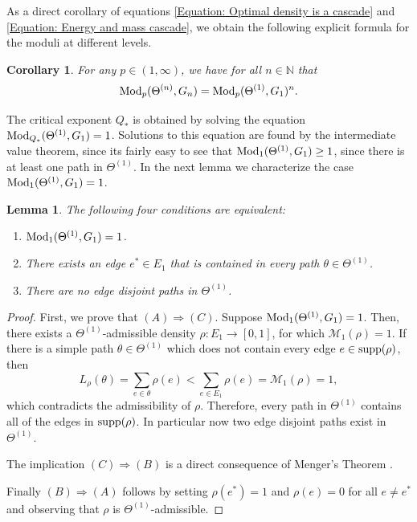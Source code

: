 \documentclass{amsart}
\newcommand{\Mod}{{\rm Mod}}
\newcommand{\supp}{{\rm supp}}
\newtheorem{lemma}[equation]{Lemma}
\newtheorem{corollary}[equation]{Corollary}
\numberwithin{equation}{section}
\theoremstyle{definition}
\theoremstyle{remark}
\newcommand{\N}{\mathbb{N}}
\newcommand{\cM}{\mathcal{M}}
\begin{document}
As a direct corollary of equations \eqref{Equation: Optimal density is a cascade} and \eqref{Equation: Energy and mass cascade}, we obtain the following explicit formula for the moduli at different levels. 

\begin{corollary}\label{Corollary: Modulus in multiplicative}
    For any \(p\in(1,\infty)\), we have for all \(n\in \N\) that 
        \[
            \Mod_p(\Theta^{(n)},G_n)=\Mod_p(\Theta^{(1)},G_1)^n.
        \]
\end{corollary}

The critical exponent $Q_*$ is obtained by solving the equation $\Mod_{Q_*}(\Theta^{(1)}, G_1)=1$. Solutions to this equation are found by the intermediate value theorem, since its fairly easy to see that $\Mod_{1}(\Theta^{(1)}, G_1)\geq 1$, since there is at least one path in $\Theta^{(1)}$. In the next lemma we characterize the case $\Mod_{1}(\Theta^{(1)}, G_1)=1$.  

\begin{lemma}\label{Lemma: Cut-points}
    The following four conditions are equivalent:
    \begin{enumerate}
        \item[(A)] \(\Mod_1(\Theta^{(1)},G_1)=1\).
        \item[(B)] There exists an edge \(e^*\in E_1\) that is contained in every path \(\theta\in\Theta^{(1)}\).
        \item[(C)] There are no edge disjoint paths in \(\Theta^{(1)}\).

    \end{enumerate}
\end{lemma}
\begin{proof}
    First, we prove that \((A)\Longrightarrow(C)\).
    Suppose \(\Mod_1(\Theta^{(1)},G_1)=1\). 
    Then, there exists a \(\Theta^{(1)}\)-admissible density \(\rho\colon E_1\to[0,1]\), for which \(\cM_1(\rho)=1\). If there is a simple path \(\theta\in\Theta^{(1)}\) which does not contain every edge \(e\in \supp(\rho)\), then
        \[
            L_\rho(\theta)=\sum_{e\in \theta}\rho(e)<\sum_{e\in E_1}\rho(e)=\cM_1(\rho)=1,
        \]
    which contradicts the admissibility of \(\rho\). Therefore, every path in \(\Theta^{(1)}\) contains all of the edges in \(\supp(\rho)\). In particular now two edge disjoint paths exist in $\Theta^{(1)}$. 
    
    The implication \((C)\Longrightarrow(B)\) is a direct consequence of Menger's Theorem \cite{menger}. 
    
    Finally \((B)\Longrightarrow(A)\) follows by setting $\rho(e^*)=1$ and $\rho(e)=0$ for all $e\neq e^*$ and observing that $\rho$ is $\Theta^{(1)}$-admissible.
\end{proof}
\end{document}
